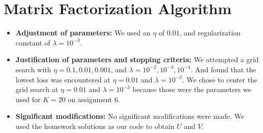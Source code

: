 \section{Matrix Factorization Algorithm}
\medskip
\begin{itemize}
  \item \textbf{Adjustment of parameters:}
    We used an $\eta$ of $0.01$, and regularization constant of
    $\lambda = 10^{-3}$.
  \item \textbf{Justification of parameters and stopping criteria:}
    We attempted a grid search with $\eta=0.1, 0.01, 0.001$, and
    $\lambda = 10^{-2}, 10^{-3}, 10^{-4}$. And found that the lowest loss was
    encountered at $\eta=0.01$ and $\lambda = 10^{-3}$. We chose to center the
    grid search at $\eta=0.01$ and $\lambda = 10^{-3}$ because those were the
    parameters we used for $K=20$ on assignment 6.
  \item \textbf{Significant modifications:}
    No significant modifications were made. We used the homework solutions as
    our code to obtain $U$ and $V$.
\end{itemize}


